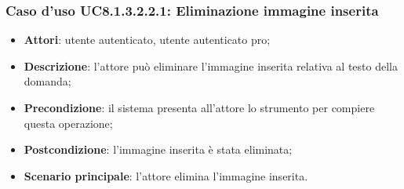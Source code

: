 \subsubsection{Caso d'uso UC8.1.3.2.2.1: Eliminazione immagine inserita}
		\begin{itemize}
		\item
			\textbf{Attori}: utente autenticato, utente autenticato pro;
		\item		
			\textbf{Descrizione}: l'attore può eliminare l'immagine inserita relativa al testo della domanda;
		\item
			\textbf{Precondizione}: il sistema presenta all'attore lo strumento per compiere questa operazione;
		\item
			\textbf{Postcondizione}: l'immagine inserita è stata eliminata;
		\item
			\textbf{Scenario principale}: l'attore elimina l'immagine inserita.				
		\end{itemize}
	
\newpage
